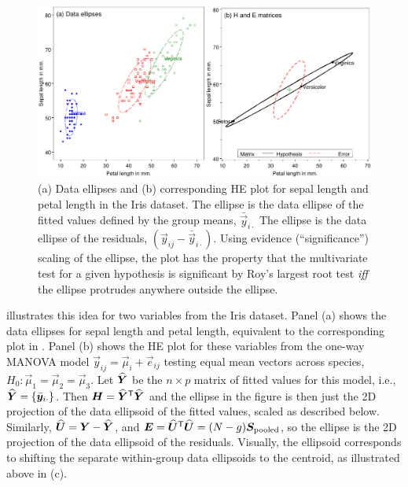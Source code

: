 \begin{figure}[htb]
  \centering
  \includegraphics[width=.9\textwidth,clip]{fig/heplot3a}
  \caption{(a) Data ellipses and (b) corresponding HE plot for sepal length and petal length in the Iris dataset.
  	The  ellipse is the data ellipse of the fitted values defined by the group means, $\bar{\vec{y}}_{i \cdot}$
  	The  ellipse is the data ellipse of the residuals, $(\vec{y}_{ij} - \bar{\vec{y}}_{i \cdot})$.
  	Using evidence (``significance'') scaling of the  ellipse, the plot has the property that
  	the multivariate test for a given hypothesis is significant by Roy's largest root test \emph{iff}
  	the  ellipse protrudes anywhere outside the  ellipse.}%
  \label{fig:heplot3a}
\end{figure}

 illustrates this idea for two variables from the Iris dataset.
Panel (a) shows the data ellipses for sepal length and petal length, equivalent to
the corresponding plot in . Panel (b) shows the HE plot for these
variables from the one-way MANOVA model $\vec{y}_{ij} = \vec{\mu}_i + \vec{e}_{ij}$
testing equal mean vectors across species, $H_0: \vec{\mu}_1 = \vec{\mu}_2 = \vec{\mu}_3$.
Let $\widehat{\bm{Y}}$ be the $n \times p$ matrix of fitted values for this model,
i.e., $\widehat{\bm{Y}} = \{ \bar{\bm{y}}_{i \cdot} \}$.
Then $\bm{H}= \widehat{\bm{Y}}^\mathsf{T} \widehat{\bm{Y}}$ and the  ellipse in the figure is then just the
2D projection of the data ellipsoid
of the fitted values, scaled as described below.
Similarly, $\widehat{\bm{U}} = \bm{Y} - \widehat{\bm{Y}}$, and 
$\bm{E} = \widehat{\bm{U}}^\mathsf{T}  \widehat{\bm{U}} = (N-g) \bm{S}_{\mathrm{pooled}}$, so the  ellipse is 
the 2D projection of the data ellipsoid of the residuals. 
Visually, the  ellipsoid corresponds to shifting the separate within-group data ellipsoids to the centroid,
as illustrated above in (c).

